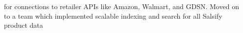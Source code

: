 \documentclass[line,margin]{res}
\begin{document}
\begin{resume}
\begin{itemize}
                          for connections to retailer APIs like Amazon, Walmart, and GDSN. Moved on \\
                          to a team which implemented scalable indexing and search for all Salsify \\
                          product data
                \end{itemize}


\end{resume}
\end{document}
